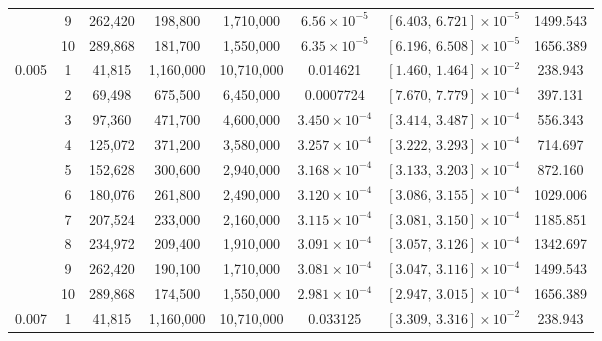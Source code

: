\begin{longtable}{c|c|c|c|c|c|c|c}
& 9 & 262,420 & 198,800 & 1,710,000
& \(6.56\times10^{-5}\)
& \(\left[6.403,\,6.721\right]\times10^{-5}\)
& 1499.543 \\ \cline{2-8}

& 10 & 289,868 & 181,700 & 1,550,000
& \(6.35\times10^{-5}\)
& \(\left[6.196,\,6.508\right]\times10^{-5}\)
& 1656.389 \\
\hline

\multirow{10}{*}{0.005}
& 1 & 41,815 & 1,160,000 & 10,710,000
& 0.014621
& \(\left[1.460,\,1.464\right]\times10^{-2}\)
& 238.943 \\ \cline{2-8}

& 2 & 69,498 & 675,500 & 6,450,000
& 0.0007724
& \(\left[7.670,\,7.779\right]\times10^{-4}\)
& 397.131 \\ \cline{2-8}

& 3 & 97,360 & 471,700 & 4,600,000
& \(3.450\times10^{-4}\)
& \(\left[3.414,\,3.487\right]\times10^{-4}\)
& 556.343 \\ \cline{2-8}

& 4 & 125,072 & 371,200 & 3,580,000
& \(3.257\times10^{-4}\)
& \(\left[3.222,\,3.293\right]\times10^{-4}\)
& 714.697 \\ \cline{2-8}

& 5 & 152,628 & 300,600 & 2,940,000
& \(3.168\times10^{-4}\)
& \(\left[3.133,\,3.203\right]\times10^{-4}\)
& 872.160 \\ \cline{2-8}

& 6 & 180,076 & 261,800 & 2,490,000
& \(3.120\times10^{-4}\)
& \(\left[3.086,\,3.155\right]\times10^{-4}\)
& 1029.006 \\ \cline{2-8}

& 7 & 207,524 & 233,000 & 2,160,000
& \(3.115\times10^{-4}\)
& \(\left[3.081,\,3.150\right]\times10^{-4}\)
& 1185.851 \\ \cline{2-8}

& 8 & 234,972 & 209,400 & 1,910,000
& \(3.091\times10^{-4}\)
& \(\left[3.057,\,3.126\right]\times10^{-4}\)
& 1342.697 \\ \cline{2-8}

& 9 & 262,420 & 190,100 & 1,710,000
& \(3.081\times10^{-4}\)
& \(\left[3.047,\,3.116\right]\times10^{-4}\)
& 1499.543 \\ \cline{2-8}

& 10 & 289,868 & 174,500 & 1,550,000
& \(2.981\times10^{-4}\)
& \(\left[2.947,\,3.015\right]\times10^{-4}\)
& 1656.389 \\
\hline

\multirow{10}{*}{0.007}
& 1 & 41,815 & 1,160,000 & 10,710,000
& 0.033125
& \(\left[3.309,\,3.316\right]\times10^{-2}\)
& 238.943 \\ \cline{2-8}


\end{longtable}
